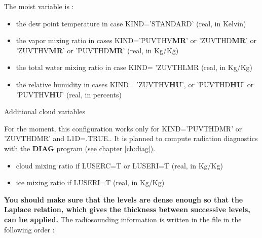 The moist variable is  :

\begin{itemize}
\item the dew point temperature in case KIND='STANDARD' (real, in Kelvin) 
\item the vapor mixing ratio
 in cases KIND='PUVTHV{\bf MR}' or 'ZUVTHD{\bf MR}' or 
'ZUVTHV{\bf MR}' or 'PUVTHD{\bf MR}' (real, in Kg/Kg) 
\item the total water  mixing ratio  in case KIND= 'ZUVTHLMR (real, in Kg/Kg)
\item  the relative humidity in cases KIND= 'ZUVTHV{\bf HU}', or 'PUVTHD{\bf HU}' or 'PUVTHV{\bf HU}' (real, in
percents)
\end{itemize}

Additional cloud variables

For the moment, this configuration works only for  KIND='PUVTHDMR' or 'ZUVTHDMR'
and  L1D=.TRUE.. It is planned to compute radiation
diagnostics with the {\bf DIAG} program (see chapter \ref{ch:diag}).

\begin{itemize}
\item
cloud mixing ratio if LUSERC=T or LUSERI=T (real, in Kg/Kg) 
\item
ice  mixing ratio if  LUSERI=T (real, in Kg/Kg) 
\end{itemize}

\vspace{0.5cm}

{\bf You should make sure that the levels are dense enough so that the Laplace
relation, which gives the thickness between successive levels, can be applied.}
The radiosounding information is written in the file  in the following order :


